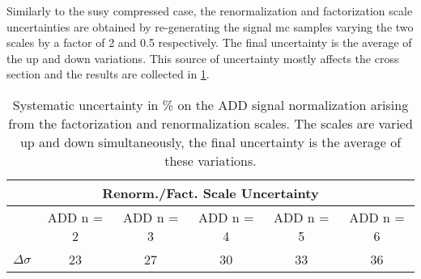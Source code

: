 Similarly to the \gls{susy} compressed case, the renormalization and
factorization scale uncertainties are obtained by re-generating the signal
\gls{mc} samples varying the two scales by a factor of 2 and 0.5
respectively. The final uncertainty is the average of the up and down
variations. This source of uncertainty mostly affects the cross section and the
results are collected in \cref{tab:add_fact_ren_scale}.
\begin{table}[!ht]
  \centering
  \begin{tabular}{lccccc}
    \toprule
    \multicolumn{6}{c}{Renorm./Fact. Scale Uncertainty} \\
    \midrule \midrule
    \quad & ADD n = 2 & ADD n = 3 & ADD n = 4 & ADD n = 5 & ADD n = 6 \\
    \midrule
    $\Delta \sigma$ & 23 & 27 & 30 & 33 & 36 \\
    \bottomrule
  \end{tabular}
  \caption{Systematic uncertainty in \% on the ADD signal normalization arising from
    the factorization and renormalization scales. The scales are varied up and
    down simultaneously, the final uncertainty is the average of these
    variations.}
  \label{tab:add_fact_ren_scale}
\end{table}

